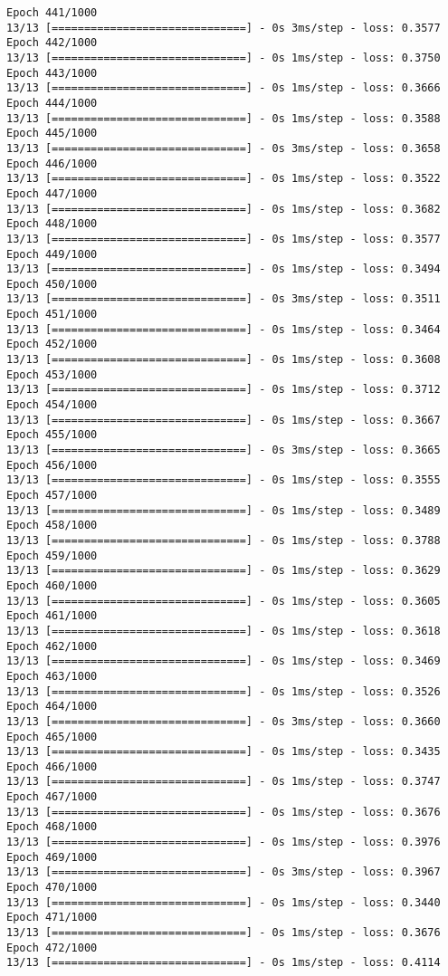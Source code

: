 \documentclass[11pt]{article}
\begin{document}
\begin{Verbatim}[commandchars=\\\{\}]
Epoch 441/1000
13/13 [==============================] - 0s 3ms/step - loss: 0.3577
Epoch 442/1000
13/13 [==============================] - 0s 1ms/step - loss: 0.3750
Epoch 443/1000
13/13 [==============================] - 0s 1ms/step - loss: 0.3666
Epoch 444/1000
13/13 [==============================] - 0s 1ms/step - loss: 0.3588
Epoch 445/1000
13/13 [==============================] - 0s 3ms/step - loss: 0.3658
Epoch 446/1000
13/13 [==============================] - 0s 1ms/step - loss: 0.3522
Epoch 447/1000
13/13 [==============================] - 0s 1ms/step - loss: 0.3682
Epoch 448/1000
13/13 [==============================] - 0s 1ms/step - loss: 0.3577
Epoch 449/1000
13/13 [==============================] - 0s 1ms/step - loss: 0.3494
Epoch 450/1000
13/13 [==============================] - 0s 3ms/step - loss: 0.3511
Epoch 451/1000
13/13 [==============================] - 0s 1ms/step - loss: 0.3464
Epoch 452/1000
13/13 [==============================] - 0s 1ms/step - loss: 0.3608
Epoch 453/1000
13/13 [==============================] - 0s 1ms/step - loss: 0.3712
Epoch 454/1000
13/13 [==============================] - 0s 1ms/step - loss: 0.3667
Epoch 455/1000
13/13 [==============================] - 0s 3ms/step - loss: 0.3665
Epoch 456/1000
13/13 [==============================] - 0s 1ms/step - loss: 0.3555
Epoch 457/1000
13/13 [==============================] - 0s 1ms/step - loss: 0.3489
Epoch 458/1000
13/13 [==============================] - 0s 1ms/step - loss: 0.3788
Epoch 459/1000
13/13 [==============================] - 0s 1ms/step - loss: 0.3629
Epoch 460/1000
13/13 [==============================] - 0s 1ms/step - loss: 0.3605
Epoch 461/1000
13/13 [==============================] - 0s 1ms/step - loss: 0.3618
Epoch 462/1000
13/13 [==============================] - 0s 1ms/step - loss: 0.3469
Epoch 463/1000
13/13 [==============================] - 0s 1ms/step - loss: 0.3526
Epoch 464/1000
13/13 [==============================] - 0s 3ms/step - loss: 0.3660
Epoch 465/1000
13/13 [==============================] - 0s 1ms/step - loss: 0.3435
Epoch 466/1000
13/13 [==============================] - 0s 1ms/step - loss: 0.3747
Epoch 467/1000
13/13 [==============================] - 0s 1ms/step - loss: 0.3676
Epoch 468/1000
13/13 [==============================] - 0s 1ms/step - loss: 0.3976
Epoch 469/1000
13/13 [==============================] - 0s 3ms/step - loss: 0.3967
Epoch 470/1000
13/13 [==============================] - 0s 1ms/step - loss: 0.3440
Epoch 471/1000
13/13 [==============================] - 0s 1ms/step - loss: 0.3676
Epoch 472/1000
13/13 [==============================] - 0s 1ms/step - loss: 0.4114

\end{Verbatim}
\end{document}
